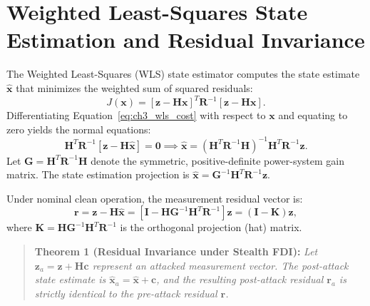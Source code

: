 \documentclass[11pt,a4paper]{report}
\begin{document}
\section{Weighted Least-Squares State Estimation and Residual Invariance}
The Weighted Least-Squares (WLS) state estimator computes the state estimate $\hat{\boldsymbol{x}}$
that minimizes the weighted sum of squared residuals:
\begin{equation}
J(\boldsymbol{x}) = [\boldsymbol{z} - \boldsymbol{H}\boldsymbol{x}]^T \boldsymbol{R}^{-1} [\boldsymbol{z} - \boldsymbol{H}\boldsymbol{x}].
\label{eq:ch3_wls_cost}
\end{equation}
Differentiating Equation~\eqref{eq:ch3_wls_cost} with respect to $\boldsymbol{x}$ and equating
to zero yields the normal equations:
\begin{equation}
\boldsymbol{H}^T \boldsymbol{R}^{-1} [\boldsymbol{z} - \boldsymbol{H}\hat{\boldsymbol{x}}] = \boldsymbol{0} \implies \hat{\boldsymbol{x}} = (\boldsymbol{H}^T \boldsymbol{R}^{-1} \boldsymbol{H})^{-1} \boldsymbol{H}^T \boldsymbol{R}^{-1} \boldsymbol{z}.
\label{eq:ch3_normal_eqs}
\end{equation}
Let $\boldsymbol{G} = \boldsymbol{H}^T \boldsymbol{R}^{-1} \boldsymbol{H}$ denote the symmetric,
positive-definite power-system gain matrix. The state estimation projection is $\hat{\boldsymbol{x}} = \boldsymbol{G}^{-1} \boldsymbol{H}^T \boldsymbol{R}^{-1} \boldsymbol{z}$.

Under nominal clean operation, the measurement residual vector is:
\begin{equation}
\boldsymbol{r} = \boldsymbol{z} - \boldsymbol{H}\hat{\boldsymbol{x}} = [\boldsymbol{I} - \boldsymbol{H}\boldsymbol{G}^{-1}\boldsymbol{H}^T\boldsymbol{R}^{-1}]\boldsymbol{z} = (\boldsymbol{I} - \boldsymbol{K})\boldsymbol{z},
\label{eq:ch3_clean_residual}
\end{equation}
where $\boldsymbol{K} = \boldsymbol{H}\boldsymbol{G}^{-1}\boldsymbol{H}^T\boldsymbol{R}^{-1}$ is the
orthogonal projection (hat) matrix.

\begin{quote}
\textbf{Theorem 1 (Residual Invariance under Stealth FDI):}
\textit{Let $\boldsymbol{z}_a = \boldsymbol{z} + \boldsymbol{H}\boldsymbol{c}$ represent an attacked
measurement vector. The post-attack state estimate is $\hat{\boldsymbol{x}}_a = \hat{\boldsymbol{x}} + \boldsymbol{c}$,
and the resulting post-attack residual $\boldsymbol{r}_a$ is strictly identical to the pre-attack residual $\boldsymbol{r}$.}
\end{quote}
\end{document}

